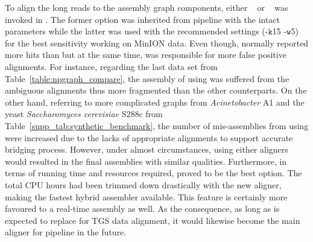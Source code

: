 To align the long reads to the assembly graph components, either \bwa{}~\cite{Li2013} or \minimap{}~\cite{Li2016} was invoked in \npgraph{}. 
The former option was inherited from \npscarf{} pipeline with the intact parameters
while the latter was used with the recommended settings (-$\mathtt{k}$15 -$\mathtt{w}$5) for the best sensitivity working on MinION data.
Even though, \bwa{} normally reported more hits than \minimap{} but at the same time, was responsible for more false positive alignments.
For instance, regarding the last data set from Table~\ref{table:npgraph_compare}, the assembly of \npgraph{} using \bwa{} was suffered from the ambiguous alignments thus more fragmented than the other counterparts. 
On the other hand, referring to more complicated graphs from \emph{Acinetobacter} A1 and the yeast \emph{Saccharomyces cerevisiae} S288c from Table~\ref{supp_tab:synthetic_benchmark}, the number of mis-assemblies from using \minimap{} were increased due to the lacks of appropriate alignments to support accurate bridging process.
However, under almost circumstances, using either aligners would resulted in the final assemblies with similar qualities.
Furthermore, in terms of running time and resources required, \minimap{} proved to be the best option. 
The total CPU hours had been trimmed down drastically with the new aligner, making \npgraph{} the fastest hybrid assembler available.
This feature is certainly more favoured to a real-time assembly as well.
As the consequence, as long as \minimap{} is expected to replace \bwa{} for TGS data alignment, it would likewise become the main aligner for \npgraph{} pipeline in the future.

